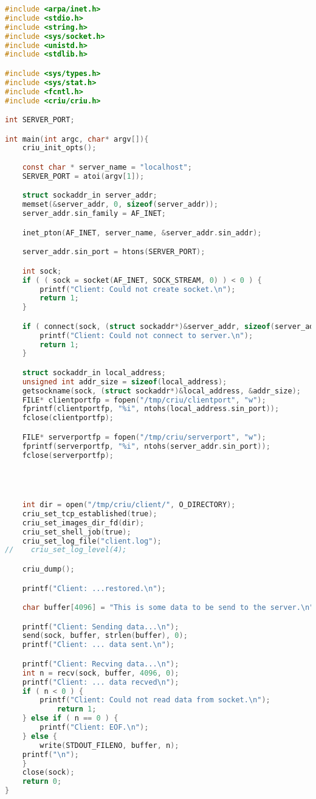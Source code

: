 \documentclass[a4paper]{article}
\begin{document}
\begin{lstlisting}[caption=Mit TCP: Client,language=C]
#include <arpa/inet.h>
#include <stdio.h>
#include <string.h>
#include <sys/socket.h>
#include <unistd.h>
#include <stdlib.h>

#include <sys/types.h>
#include <sys/stat.h>
#include <fcntl.h>
#include <criu/criu.h>

int SERVER_PORT;

int main(int argc, char* argv[]){
    criu_init_opts();

    const char * server_name = "localhost";
    SERVER_PORT = atoi(argv[1]);

    struct sockaddr_in server_addr;
    memset(&server_addr, 0, sizeof(server_addr));
    server_addr.sin_family = AF_INET;

    inet_pton(AF_INET, server_name, &server_addr.sin_addr);

    server_addr.sin_port = htons(SERVER_PORT);

    int sock;
    if ( ( sock = socket(AF_INET, SOCK_STREAM, 0) ) < 0 ) {
        printf("Client: Could not create socket.\n");
        return 1;
    }

    if ( connect(sock, (struct sockaddr*)&server_addr, sizeof(server_addr)) < 0 ) {
        printf("Client: Could not connect to server.\n");
        return 1;
    }

    struct sockaddr_in local_address;
    unsigned int addr_size = sizeof(local_address);
    getsockname(sock, (struct sockaddr*)&local_address, &addr_size);
    FILE* clientportfp = fopen("/tmp/criu/clientport", "w");
    fprintf(clientportfp, "%i", ntohs(local_address.sin_port));
    fclose(clientportfp);

    FILE* serverportfp = fopen("/tmp/criu/serverport", "w");
    fprintf(serverportfp, "%i", ntohs(server_addr.sin_port));
    fclose(serverportfp);




    int dir = open("/tmp/criu/client/", O_DIRECTORY);
    criu_set_tcp_established(true);
    criu_set_images_dir_fd(dir);
    criu_set_shell_job(true);
    criu_set_log_file("client.log");
//    criu_set_log_level(4);

    criu_dump();

    printf("Client: ...restored.\n");

    char buffer[4096] = "This is some data to be send to the server.\n";

    printf("Client: Sending data...\n");
    send(sock, buffer, strlen(buffer), 0);
    printf("Client: ... data sent.\n");

    printf("Client: Recving data...\n");
    int n = recv(sock, buffer, 4096, 0);
    printf("Client: ... data recved\n");
    if ( n < 0 ) {
        printf("Client: Could not read data from socket.\n");
            return 1;
    } else if ( n == 0 ) {
        printf("Client: EOF.\n");
    } else {
        write(STDOUT_FILENO, buffer, n);
	printf("\n");
    }
    close(sock);
    return 0;
}
\end{lstlisting}
\end{document}
